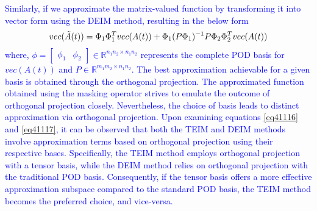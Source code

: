 \documentclass{article}
\begin{document}
\textcolor{blue}{Similarly, if we approximate the matrix-valued function by transforming it into vector form using the DEIM method, resulting in the below form \cite{SecondPaper}
\begin{equation}\label{eq41117}
    vec(\Tilde{A}(t))=\Phi_1\Phi_1^Tvec(A(t)) +\Phi_1(P\Phi_1)^{-1}P\Phi_2\Phi_2^Tvec(A(t))
\end{equation}
where, $\phi=\begin{bmatrix}
    \phi_1 & \phi_2
\end{bmatrix}\in \mathbb{R}^{n_1n_2 \times n_1n_2}$ represents the complete POD basis for $vec(A(t))$ and $P \in \mathbb{R}^{m_1m_2 \times n_1n_2}$.
The best approximation achievable for a given basis is obtained through the orthogonal projection. The approximated function obtained using the masking operator strives to emulate the outcome of orthogonal projection closely. Nevertheless, the choice of basis leads to distinct approximation via orthogonal projection.
Upon examining equations \eqref{eq41116} and \eqref{eq41117}, it can be observed that both the TEIM and DEIM methods involve approximation terms based on orthogonal projection using their respective bases. Specifically, the TEIM method employs orthogonal projection with a tensor basis, while the DEIM method relies on orthogonal projection with the traditional POD basis. Consequently, if the tensor basis offers a more effective approximation subspace compared to the standard POD basis, the TEIM method becomes the preferred choice, and vice-versa.}

\textcolor{blue}{
\begin{table}[]
\caption{Computational complexity corresponding to different methods where $n_1,n_2$ signifies the dimension of original matrix ($A(t)$) and $m_1m_2$ denote the number of interpolation points ($m_1<<n_1$ and $m_2 << n_2$) used to approximate the function $A(t)$.}
\label{tab:table41}
\end{table}
}
\end{document}

